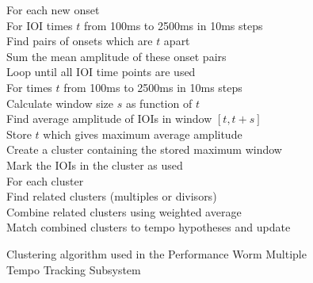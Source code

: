\documentclass[a4paper, 11pt]{article}
\begin{document}
\begin{figure}
	\hspace{10mm} For each new onset\\
	\hspace*{20mm} For IOI times $\mathit{t}$ from 100ms to 2500ms in 10ms steps\\
	\hspace*{30mm} Find pairs of onsets which are $\mathit{t}$ apart\\
	\hspace*{30mm} Sum the mean amplitude of these onset pairs\\
	\hspace*{20mm} Loop until all IOI time points are used\\
	\hspace*{30mm} For times $\mathit{t}$ from 100ms to 2500ms in 10ms steps\\
	\hspace*{40mm} Calculate window size $\mathit{s}$ as function of $\mathit{t}$\\
	\hspace*{40mm} Find average amplitude of IOIs in window $\mathit{[t, t + s]}$\\
	\hspace*{40mm} Store $\mathit{t}$ which gives maximum average amplitude\\
	\hspace*{30mm} Create a cluster containing the stored maximum window\\
	\hspace*{30mm} Mark the IOIs in the cluster as used\\
	\hspace*{20mm} For each cluster\\
	\hspace*{30mm} Find related clusters (multiples or divisors)\\
	\hspace*{30mm} Combine related clusters using weighted average\\
	\hspace*{20mm} Match combined clusters to tempo hypotheses and update\\
	\caption{Clustering algorithm used in the Performance Worm Multiple Tempo Tracking Subsystem\cite{dixonGoeblWidmer}}
	\label{fig: clusterAl}
\end{figure}
\end{document}
